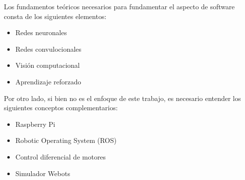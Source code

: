 
Los fundamentos teóricos necesarios para fundamentar el aspecto de software consta de los siguientes elementos:
\begin{itemize}
\item Redes neuronales
\item Redes convulocionales
\item Visión computacional
\item Aprendizaje reforzado
\end{itemize}

Por otro lado, si bien no es el enfoque de este trabajo, es necesario entender los siguientes conceptos complementarios:
\begin{itemize}
\item Raspberry Pi
\item Robotic Operating System (ROS)
\item Control diferencial de motores
\item Simulador Webots
\end{itemize}